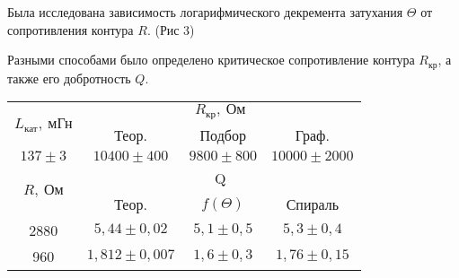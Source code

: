 Была исследована зависимость
логарифмического декремента
затухания $\Theta$ от сопротивления
контура $R$. (Рис 3)

Разными способами было определено
критическое сопротивление контура
$R_\text{кр}$, а также его
добротность $Q$.
\begin{table}[H]
\begin{tabular}{|c|c|c|c|}
\hline
\multirow{2}{*}{$L_\text{кат}, \
\text{мГн}$} &
\multicolumn{3}{c|}{$R_\text{кр}, \
\text{Ом}$}                          \\ \cline{2-4}
                   &
Теор.               &
Подбор            &
Граф.             \\ \hline
$137 \pm 3$          & $10400 \pm 400$   &
$9800 \pm 800$ & $10000 \pm 2000$ \\ \hline
\hline
\multirow{2}{*}{$R, \ \text{Ом}$} & \multicolumn{3}{c|}{Q}                          \\ \cline{2-4}
                   &
Теор.             &
$f(\Theta)$           & Спираль 
\\ \hline
2880               & $5,44 \pm 0,02$   &
$5,1 \pm 0,5$  & $5,3 \pm 0,4$    \\ \hline
960                & $1,812 \pm 0,007$ &
$1,6 \pm 0,3$  & $1,76 \pm 0,15$  \\ \hline
\end{tabular}
\end{table}

